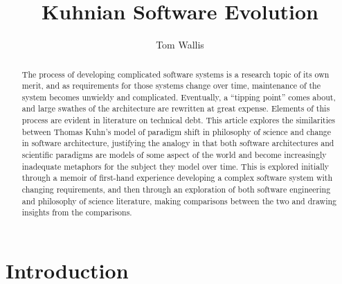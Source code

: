 \documentclass[12pt,draft]{article}
\title{Kuhnian Software Evolution}
\author{Tom Wallis}
\date{}
\begin{document}
\maketitle

\begin{abstract}
  The process of developing complicated software systems is a research topic of
  its own merit, and as requirements for those systems change over time,
  maintenance of the system becomes unwieldy and complicated. Eventually, a
  ``tipping point'' comes about, and large swathes of the architecture are
  rewritten at great expense. Elements of this process are evident in literature
  on technical debt. This article explores the similarities between Thomas
  Kuhn's model of paradigm shift in philosophy of science and change in software
  architecture, justifying the analogy in that both software architectures and
  scientific paradigms are models of some aspect of the world and become
  increasingly inadequate metaphors for the subject they model over time. This
  is explored initially through a memoir of first-hand experience developing a
  complex software system with changing requirements, and then through an
  exploration of both software engineering and philosophy of science literature,
  making comparisons between the two and drawing insights from the comparisons.
\end{abstract}

\section{Introduction}
\end{document}
